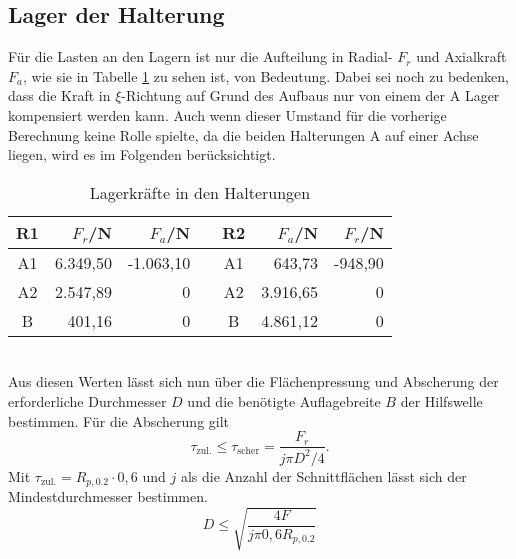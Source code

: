 \subsection{Lager der Halterung}
Für die Lasten an den Lagern ist nur die Aufteilung in Radial- $F_r$ und Axialkraft $F_a$, wie sie in Tabelle \ref{tab_lagerkraefte} zu sehen ist, von Bedeutung. Dabei sei noch zu bedenken, dass die Kraft in $\xi$-Richtung auf Grund des Aufbaus nur von einem der A Lager kompensiert werden kann. Auch wenn dieser Umstand für die vorherige Berechnung keine Rolle spielte, da die beiden Halterungen A auf einer Achse liegen, wird es im Folgenden berücksichtigt.
\begin{table}[h] 
	\centering 
	\caption{Lagerkräfte in den Halterungen}
	\label{tab_lagerkraefte}
	\begin{tabular}{c|r|rc||c|r|r} 
		\textbf{R1}&$F_{r}$/N&$F_a$/N&&\textbf{R2}&$F_{a}$/N&$F_r$/N\\ 
		\hline 
		A1& 6.349,50&-1.063,10&&A1&643,73&-948,90\\
		A2&2.547,89&0&&A2&3.916,65&0\\
		B&401,16&0&&B&4.861,12&0\\
	\end{tabular}
\end{table} \\
Aus diesen Werten lässt sich nun über die Flächenpressung und Abscherung der erforderliche Durchmesser $D$ und die benötigte Auflagebreite $B$ der Hilfswelle bestimmen. Für die Abscherung gilt
\begin{equation}
	\tau_{\mathrm{zul.}}\leq\tau_\mathrm{scher}=\frac{F_r}{j\pi D^2/4}.
\end{equation}
Mit $\tau_{\mathrm{zul.}}=R_{p, 0.2}\cdot 0,6$ \cite{metall} und $j$ als die Anzahl der Schnittflächen lässt sich der Mindestdurchmesser bestimmen.
\begin{equation}
	D \leq \sqrt{\frac{4F}{j\pi 0,6 R_{p, 0.2}}}
\end{equation}
